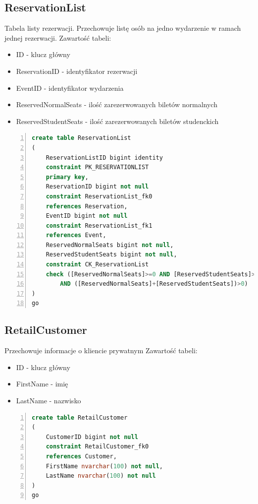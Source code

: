 \documentclass[]{article}
\begin{document}
	\subsection{ReservationList}
	Tabela listy rezerwacji. Przechowuje listę osób na jedno wydarzenie w ramach jednej rezerwacji. Zawartość tabeli:
	\begin{itemize}
		\item ID - klucz główny
		\item ReservationID - identyfikator rezerwacji
		\item EventID - identyfikator wydarzenia
		\item ReservedNormalSeats - ilość zarezerwowanych biletów normalnych
		\item ReservedStudentSeats - ilość zarezerwowanych biletów studenckich
	\end{itemize}
	\begin{lstlisting}[language=SQL,
						showspaces=false,
						basicstyle=\ttfamily,
						numbers=left,
						numberstyle=\tiny,
						backgroundcolor=\color{lightg},
						keywordstyle=\color{lightblue},
						commentstyle=\color{gray}]
create table ReservationList
(
	ReservationListID bigint identity
	constraint PK_RESERVATIONLIST
	primary key,
	ReservationID bigint not null
	constraint ReservationList_fk0
	references Reservation,
	EventID bigint not null
	constraint ReservationList_fk1
	references Event,
	ReservedNormalSeats bigint not null,
	ReservedStudentSeats bigint not null,
	constraint CK_ReservationList
	check ([ReservedNormalSeats]>=0 AND [ReservedStudentSeats]>=0
		AND ([ReservedNormalSeats]+[ReservedStudentSeats])>0)
)
go
	\end{lstlisting}
	\subsection{RetailCustomer}
	Przechowuje informacje o kliencie prywatnym Zawartość tabeli:
	\begin{itemize}
		\item ID - klucz główny
		\item FirstName - imię
		\item LastName - nazwisko
	\end{itemize}
	\begin{lstlisting}[language=SQL,
						showspaces=false,
						basicstyle=\ttfamily,
						numbers=left,
						numberstyle=\tiny,
						backgroundcolor=\color{lightg},
						keywordstyle=\color{lightblue},
						commentstyle=\color{gray}]
create table RetailCustomer
(
	CustomerID bigint not null
	constraint RetailCustomer_fk0
	references Customer,
	FirstName nvarchar(100) not null,
	LastName nvarchar(100) not null
)
go
	\end{lstlisting}
\end{document}
